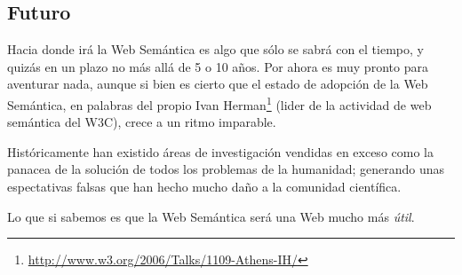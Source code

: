 \subsection{Futuro}

Hacia donde irá la Web Semántica es algo que sólo se sabrá con el tiempo, y quizás
en un plazo no más allá de 5 o 10 años. Por ahora es muy pronto para aventurar nada,
aunque si bien es cierto que el estado de adopción de la Web Semántica, en palabras
del propio Ivan Herman\footnote{\url{http://www.w3.org/2006/Talks/1109-Athens-IH/}}
(lider de la actividad de web semántica del W3C), crece a un ritmo imparable.

Históricamente han existido áreas de investigación vendidas en exceso como la 
panacea de la solución de todos los problemas de la humanidad; generando unas 
espectativas falsas que han hecho mucho daño a la comunidad científica.

Lo que si sabemos es que la Web Semántica será una Web mucho más \emph{útil}.
